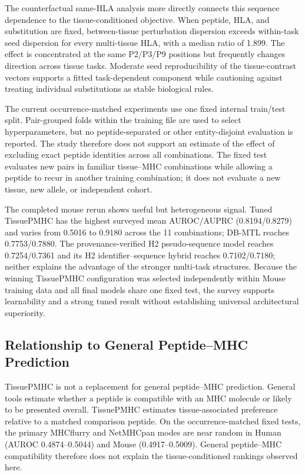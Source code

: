 The counterfactual same-HLA analysis more directly connects this sequence dependence to the tissue-conditioned objective. When peptide, HLA, and substitution are fixed, between-tissue perturbation dispersion exceeds within-task seed dispersion for every multi-tissue HLA, with a median ratio of 1.899. The effect is concentrated at the same P2/P3/P9 positions but frequently changes direction across tissue tasks. Moderate seed reproducibility of the tissue-contrast vectors supports a fitted task-dependent component while cautioning against treating individual substitutions as stable biological rules.

The current occurrence-matched experiments use one fixed internal train/test split. Pair-grouped folds within the training file are used to select hyperparameters, but no peptide-separated or other entity-disjoint evaluation is reported. The study therefore does not support an estimate of the effect of excluding exact peptide identities across all combinations. The fixed test evaluates new pairs in familiar tissue--MHC combinations while allowing a peptide to recur in another training combination; it does not evaluate a new tissue, new allele, or independent cohort.

The completed mouse rerun shows useful but heterogeneous signal. Tuned TissuePMHC has the highest surveyed mean AUROC/AUPRC (0.8194/0.8279) and varies from 0.5016 to 0.9180 across the 11 combinations; DB-MTL reaches 0.7753/0.7880. The provenance-verified H2 pseudo-sequence model reaches 0.7254/0.7361 and its H2 identifier--sequence hybrid reaches 0.7102/0.7180; neither explains the advantage of the stronger multi-task structures. Because the winning TissuePMHC configuration was selected independently within Mouse training data and all final models share one fixed test, the survey supports learnability and a strong tuned result without establishing universal architectural superiority.

\subsection{Relationship to General Peptide--MHC Prediction}

TissuePMHC is not a replacement for general peptide--MHC prediction. General tools estimate whether a peptide is compatible with an MHC molecule or likely to be presented overall. TissuePMHC estimates tissue-associated preference relative to a matched comparison peptide. On the occurrence-matched fixed tests, the primary MHCflurry and NetMHCpan modes are near random in Human (AUROC 0.4874--0.5044) and Mouse (0.4917--0.5009). General peptide--MHC compatibility therefore does not explain the tissue-conditioned rankings observed here.

